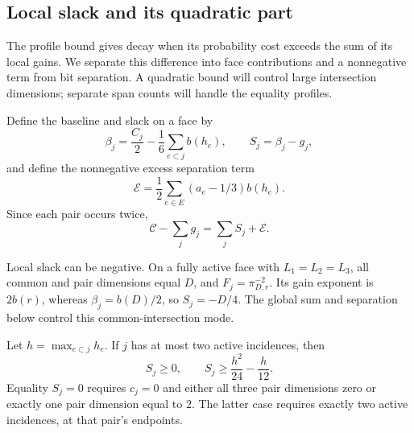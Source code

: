 \subsection{Local slack and its quadratic part}

The profile bound gives decay when its probability cost exceeds the
sum of its local gains. We separate this difference into face
contributions and a nonnegative term from bit separation. A quadratic
bound will control large intersection dimensions; separate span
counts will handle the equality profiles.

Define the baseline and slack on a face by
\[
 \beta_j=\frac{C_j}{2}-\frac16\sum_{e\subset j}b(h_e),
 \qquad S_j=\beta_j-g_j,
\]
and define the nonnegative excess separation term
\begin{equation}\label{eq:tail-excess}
 \mathcal E=\frac12\sum_{e\in E}(a_e-1/3)b(h_e).
\end{equation}
Since each pair occurs twice,
\begin{equation}\label{eq:tail-total-slack}
\mathcal C-\sum_jg_j=\sum_j S_j+\mathcal E.
\end{equation}

Local slack can be negative. On a fully active face with
\(L_1=L_2=L_3\), all common and pair dimensions equal \(D\), and
\(F_j=\pi_{D,r}^{-2}\). Its gain exponent is \(2b(r)\), whereas
\(\beta_j=b(D)/2\), so \(S_j=-D/4\). The global sum and separation
below control this common-intersection mode.

\begin{lemma}\label{lem:tail-lower-active}
Let $h=\max_{e\subset j}h_e$.  If $j$ has at most two active incidences,
then
\begin{equation}\label{eq:tail-lower-active}
 S_j\ge0,
 \qquad S_j\ge\frac{h^2}{24}-\frac h{12}.
\end{equation}
Equality $S_j=0$ requires $c_j=0$ and either all three pair dimensions
zero or exactly one pair dimension equal to $2$.  The latter case
requires exactly two active incidences, at that pair's endpoints.
\end{lemma}

